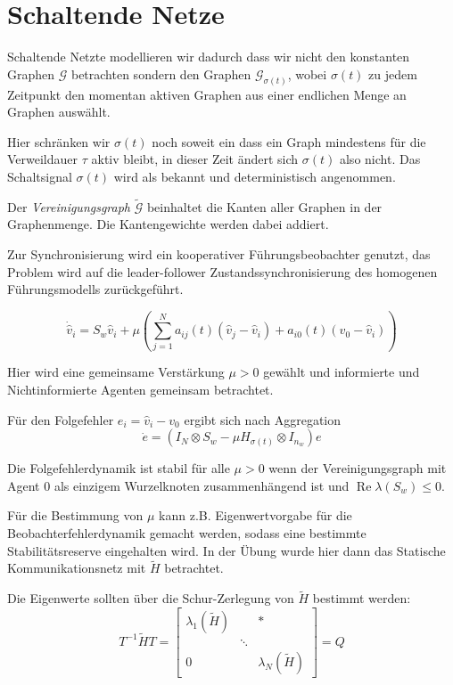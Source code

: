 \pagebreak
\section{Schaltende Netze}

Schaltende Netzte modellieren wir dadurch dass wir nicht den konstanten
Graphen $\mathcal{G}$ betrachten sondern den Graphen $\mathcal{G}_{\sigma(t)}$,
wobei $\sigma(t)$ zu jedem Zeitpunkt den momentan aktiven Graphen
aus einer endlichen Menge an Graphen auswählt.

Hier schränken wir $\sigma(t)$ noch soweit ein dass ein Graph mindestens
für die Verweildauer $\tau$ aktiv bleibt, in dieser Zeit ändert sich
$\sigma(t)$ also nicht.
Das Schaltsignal $\sigma(t)$ wird als bekannt und deterministisch 
angenommen.

Der \emph{Vereinigungsgraph} $\tilde{\mathcal{G}}$ beinhaltet die Kanten
aller Graphen in der Graphenmenge.
Die Kantengewichte werden dabei addiert.

Zur Synchronisierung wird ein kooperativer Führungsbeobachter genutzt,
das Problem wird auf die leader-follower Zustandssynchronisierung
des homogenen Führungsmodells zurückgeführt.

\begin{equation}
    \dot{\hat{v}}_i = S_w \hat{v}_i + \mu \left( \sum_{j=1}^N a_{ij}(t)
    (\hat{v}_j - \hat{v}_i) + a_{i0}(t)(v_0 - \hat{v}_i) \right)   
\end{equation}

Hier wird eine gemeinsame Verstärkung $\mu >0$ gewählt und informierte
und Nichtinformierte Agenten gemeinsam betrachtet.

Für den Folgefehler $e_i = \hat{v}_i - v_0$ ergibt sich nach Aggregation
\begin{equation}
    \dot{e} = (I_N \otimes S_w - \mu H_{\sigma(t)} \otimes I_{n_w}) e
\end{equation}

Die Folgefehlerdynamik ist stabil für alle $\mu > 0$ wenn der Vereinigungsgraph
mit Agent 0 als einzigem Wurzelknoten zusammenhängend ist und
$\operatorname{Re}\lambda(S_w) \leq 0$.

Für die Bestimmung von $\mu$ kann z.B. Eigenwertvorgabe für die
Beobachterfehlerdynamik gemacht werden, sodass eine bestimmte
Stabilitätsreserve eingehalten wird.
In der Übung wurde hier dann das Statische Kommunikationsnetz
mit $\tilde{H}$ betrachtet.

Die Eigenwerte sollten über die Schur-Zerlegung von $\tilde{H}$
bestimmt werden:
\begin{equation}
    T^{-1}\tilde{H}T = \begin{bmatrix}
        \lambda_1(\tilde{H}) & &* \\
        & \ddots & \\
        0 & & \lambda_N(\tilde{H})
    \end{bmatrix}=Q
\end{equation}


